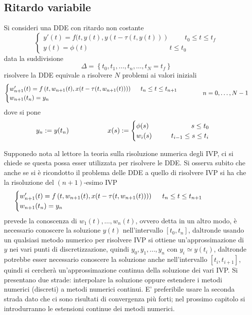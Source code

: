 \subsection{Ritardo variabile}
Si consideri una DDE con ritardo non costante
$$
\begin{cases}
 y'(t) = f(t,y(t),y(t- \tau (t,y(t)))	\hspace{1cm}	t_0 \le t \le t_f \\
 y(t)=\phi(t)				\hspace{5cm}	t \le t_0
\end{cases}
$$
data la suddivisione
$$
\Delta= \left \{ t_0, t_1, \dots , t_n , \dots , t_N = t_f \right \}
$$
risolvere la DDE equivale a risolvere $N$ problemi ai valori iniziali
$$
\begin{cases}
 w_{n+1}'(t)= f \left(t, w_{n+1}(t), x(t-\tau(t,w_{n+1}(t))) \right)	\hspace{0.5cm}	t_n \le t \le t_{n+1}	\\
 w_{n+1}(t_n)=y_n
\end{cases}
\hspace{1cm}
n=0, \dots, N-1
$$
dove si pone
$$
y_n:=y(t_n)	\hspace{2cm}
x(s):=
\begin{cases}
 \phi(s)	\hspace{2.2cm}	s \le t_0			\\
 w_{i}(s)	\hspace{1cm}	t_{i-1} \le s \le t_i 	
\end{cases}
$$

Supponedo nota al lettore la teoria sulla risoluzione numerica degli IVP, ci si chiede se questa possa esser 
utilizzata per risolvere le DDE. Si osserva subito che anche se si è ricondotto il problema 
delle DDE a quello di risolvere IVP si ha che la risoluzione del $(n+1)$-esimo IVP
$$
\begin{cases}
 w_{n+1}'(t)= f \left(t, w_{n+1}(t), x(t-\tau(t,w_{n+1}(t))) \right)	\hspace{0.5cm}	t_n \le t \le t_{n+1}	\\
 w_{n+1}(t_n)=y_n
\end{cases} \hspace{1.5cm}
$$
prevede la conoscenza di $w_1(t), \dots, w_n(t)$, ovvero detta in un altro modo, è necessario 
conoscere la soluzione $y(t)$ nell'intervallo $[t_0, t_n]$, daltronde usando un qualsiasi metodo 
numerico per risolvere IVP si ottiene un'approssimazione di $y$ nei vari 
punti di discretizzazione, quindi $y_0, y_1, \dots , y_n$ con $y_i \simeq y(t_i)$, daltronde potrebbe esser 
necessario conoscere la soluzione anche nell'intervallo $[t_i,t_{i+1}]$, quindi si cercherà 
un'approssimazione continua della soluzione dei vari IVP. Si presentano due strade: 
interpolare la soluzione oppure estendere i metodi numerici (discreti) a metodi numerici continui. 
E' preferibile usare la seconda strada dato che ci sono risultati di convergenza più forti; nel prossimo capitolo 
si introdurranno le estensioni continue dei metodi numerici.

